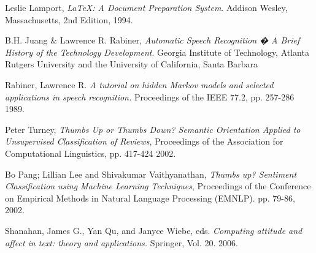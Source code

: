 \documentclass[a4paper,12pt,twoside]{ltxdoc}
\begin{document}
\begin{thebibliography}{9}

  Leslie Lamport,
  \emph{\LaTeX: A Document Preparation System}.
  Addison Wesley, Massachusetts,
  2nd Edition,
  1994.
  
  B.H. Juang \& Lawrence R. Rabiner,
  \emph{Automatic Speech Recognition � A Brief History of the Technology Development}.
  Georgia Institute of Technology, Atlanta
  Rutgers University and the University of California, Santa Barbara
  
Rabiner, Lawrence R.
\emph{A tutorial on hidden Markov models and selected applications in speech recognition.}
Proceedings of the IEEE 77.2,
pp. 257-286
1989.

Peter Turney, 
\emph{Thumbs Up or Thumbs Down? Semantic Orientation Applied to Unsupervised Classification of Reviews},
 Proceedings of the Association for Computational Linguistics,
 pp. 417-424
 2002.

  Bo Pang; Lillian Lee and Shivakumar Vaithyanathan,
  \emph{Thumbs up? Sentiment Classification using Machine Learning Techniques},
  Proceedings of the Conference on Empirical Methods in Natural Language Processing (EMNLP).
  pp. 79-86,
  2002.

  Shanahan, James G., Yan Qu, and Janyce Wiebe, eds.
  \emph{Computing attitude and affect in text: theory and applications.}
  Springer, 
  Vol. 20.
  2006.

\end{thebibliography}
\end{document}
